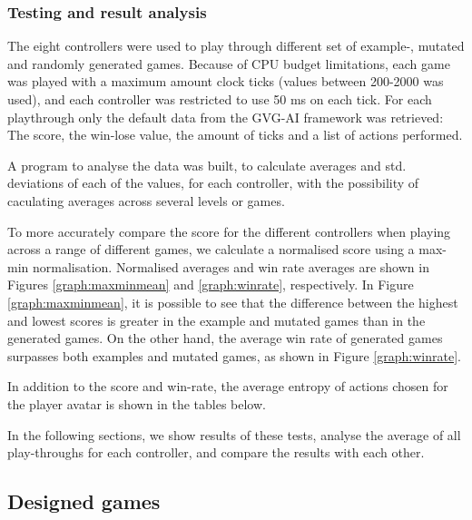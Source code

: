 \documentclass[a4paper,titlepage,final, twoside]{report}
\begin{document}
\subsubsection*{Testing and result analysis}
The eight controllers were used to play through different set of example-, mutated and randomly generated games. Because of CPU budget limitations, each game was played with a maximum amount clock ticks (values between 200-2000 was used), and each controller was restricted to use 50 ms on each tick. 
For each playthrough only the default data from the GVG-AI framework was retrieved: The score, the win-lose value, the amount of ticks and a list of actions performed.

A program to analyse the data was built, to calculate averages and std. deviations of each of the values, for each controller, with the possibility of caculating averages across several levels or games.

To more accurately compare the score for the different controllers when playing across a range of different games,  we calculate a normalised score using a max-min normalisation. 
Normalised averages and win rate averages are shown in Figures \ref{graph:maxminmean} and \ref{graph:winrate}, respectively. In Figure \ref{graph:maxminmean}, it is possible to see that the difference between the highest and lowest scores is greater in the example and mutated games than in the generated games. On the other hand, the average win rate of generated games surpasses both examples and mutated games, as shown in Figure \ref{graph:winrate}.

In addition to the score and win-rate, the average entropy of actions chosen for the player avatar is shown in the tables below.

In the following sections, we show results of these tests, analyse the average of all play-throughs for each controller, and compare the results with each other.


\subsection{Designed games}
\end{document}
